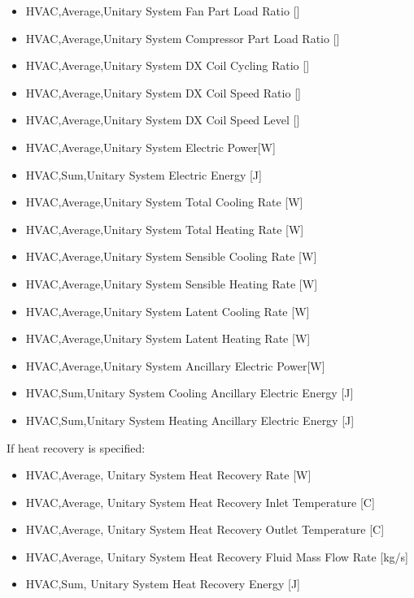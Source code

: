 \begin{itemize}
\item
  HVAC,Average,Unitary System Fan Part Load Ratio {[]}
\item
  HVAC,Average,Unitary System Compressor Part Load Ratio {[]}
\item
  HVAC,Average,Unitary System DX Coil Cycling Ratio {[]}
\item
  HVAC,Average,Unitary System DX Coil Speed Ratio {[]}
\item
  HVAC,Average,Unitary System DX Coil Speed Level {[]}
\item
  HVAC,Average,Unitary System Electric Power{[}W{]}
\item
  HVAC,Sum,Unitary System Electric Energy {[}J{]}
\item
  HVAC,Average,Unitary System Total Cooling Rate {[}W{]}
\item
  HVAC,Average,Unitary System Total Heating Rate {[}W{]}
\item
  HVAC,Average,Unitary System Sensible Cooling Rate {[}W{]}
\item
  HVAC,Average,Unitary System Sensible Heating Rate {[}W{]}
\item
  HVAC,Average,Unitary System Latent Cooling Rate {[}W{]}
\item
  HVAC,Average,Unitary System Latent Heating Rate {[}W{]}
\item
  HVAC,Average,Unitary System Ancillary Electric Power{[}W{]}
\item
  HVAC,Sum,Unitary System Cooling Ancillary Electric Energy {[}J{]}
\item
  HVAC,Sum,Unitary System Heating Ancillary Electric Energy {[}J{]}
\end{itemize}

If heat recovery is specified:

\begin{itemize}
\item
  HVAC,Average, Unitary System Heat Recovery Rate {[}W{]}
\item
  HVAC,Average, Unitary System Heat Recovery Inlet Temperature {[}C{]}
\item
  HVAC,Average, Unitary System Heat Recovery Outlet Temperature {[}C{]}
\item
  HVAC,Average, Unitary System Heat Recovery Fluid Mass Flow Rate {[}kg/s{]}
\item
  HVAC,Sum, Unitary System Heat Recovery Energy {[}J{]}
\end{itemize}

